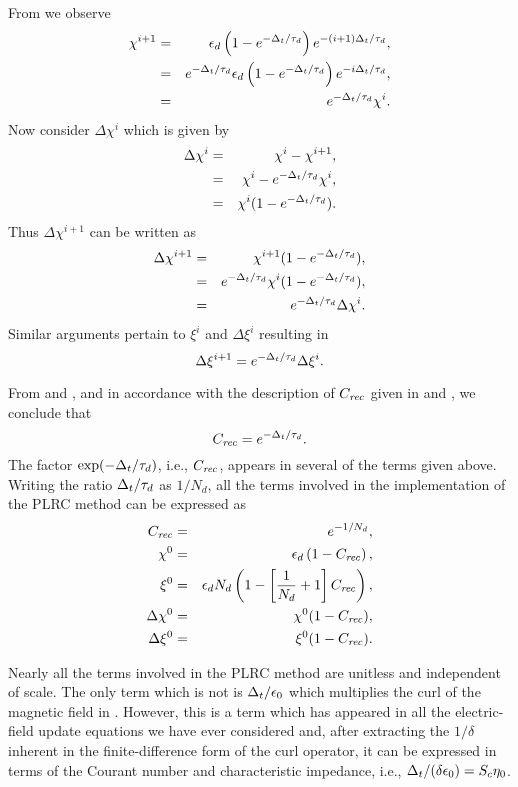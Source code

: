 From  we observe
\begin{eqnarray}
  \chi^{i+1} &=&
                 \epsilon_d\left(1-e^{-\Delta_t/\tau_d}\right)
                 e^{-(i+1)\Delta_t/\tau_d}, \nonumber\\
             &=& e^{-\Delta_t/\tau_d}
                 \epsilon_d\left(1-e^{-\Delta_t/\tau_d}\right)
                 e^{-i\Delta_t/\tau_d},\nonumber\\
             &=& e^{-\Delta_t/\tau_d} \chi^i.
\end{eqnarray}
Now consider $\Delta\chi^i$ which is given by
\begin{eqnarray}
  \Delta\chi^i &=& \chi^i - \chi^{i+1}, \nonumber\\
              &=& \chi^i - e^{-\Delta_t/\tau_d}\chi^i, \nonumber\\
              &=& \chi^i(1 - e^{-\Delta_t/\tau_d}).
\end{eqnarray}
Thus $\Delta\chi^{i+1}$ can be written as
\begin{eqnarray}
  \Delta\chi^{i+1} &=& \chi^{i+1}(1 - e^{-\Delta_t/\tau_d}), \nonumber\\
        &=& e^{-\Delta_t/\tau_d}\chi^{i}(1 - e^{-\Delta_t/\tau_d}), \nonumber\\
        &=& e^{-\Delta_t/\tau_d}\Delta\chi^{i}.
            \label{eq:prlcDelChiRecursion}
\end{eqnarray}
Similar arguments pertain to $\xi^i$ and $\Delta\xi^i$ resulting in
\begin{equation}
  \Delta\xi^{i+1} =e^{-\Delta_t/\tau_d} \Delta\xi^i.
            \label{eq:prlcDelXiRecursion}
\end{equation}

From  and ,
and in accordance with the description of $C_{\mathit{rec}}$ given in
 and , we conclude that
\begin{equation}
  C_{\mathit{rec}} = e^{-\Delta_t/\tau_d}.
\end{equation}
The factor $\exp(-\Delta_t/\tau_d)$, i.e., $C_{\mathit{rec}}$, appears in several of
the terms given above.  Writing the ratio $\Delta_t/\tau_d$ as $1/N_d$,
all the terms involved in the implementation of the PLRC method can be
expressed as
\begin{eqnarray}
  C_{\mathit{rec}} &=& e^{-1/N_d}, \\
  \chi^0 &=& \epsilon_d\left(1-C_{\mathit{rec}}\right), \\
  \xi^0  &=& \epsilon_d N_d
             \left(1-\left[\frac{1}{N_d}+1\right]C_{\mathit{rec}}\right), \\
  \Delta\chi^0 &=& \chi^0(1-C_{\mathit{rec}}), \\
  \Delta\xi^0  &=& \xi^0(1-C_{\mathit{rec}}).
\end{eqnarray}

Nearly all the terms involved in the PLRC method are unitless and
independent of scale.  The only term which is not is
$\Delta_t/\epsilon_0$ which multiplies the curl of the magnetic field in
.  However, this is a term which has appeared in
all the electric-field update equations we have ever considered and,
after extracting the $1/\delta$ inherent in the finite-difference form
of the curl operator, it can be expressed in terms of the Courant
number and characteristic impedance, i.e.,
$\Delta_t/(\delta\epsilon_0)=S_c\eta_0$.
